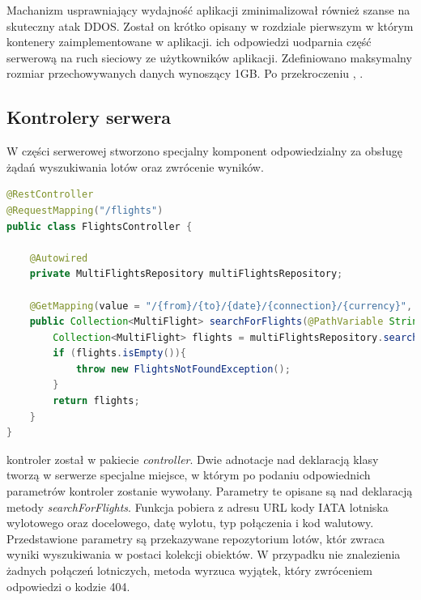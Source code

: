 \documentclass[12pt, twoside]{report}
\begin{document}
Machanizm  usprawniający wydajność aplikacji zminimalizował również szanse na skuteczny atak DDOS. Został on krótko opisany w rozdziale pierwszym w którym  kontenery  zaimplementowane w aplikacji.  ich odpowiedzi uodparnia część serwerową na  ruch sieciowy ze  użytkowników aplikacji. Zdefiniowano  maksymalny rozmiar przechowywanych danych wynoszący 1GB. Po  przekroczeniu , .

\subsection{Kontrolery serwera}
W części serwerowej stworzono specjalny komponent odpowiedzialny za obsługę żądań wyszukiwania lotów oraz zwrócenie  wyników. 
\begin{lstlisting}[language=java, caption=Kontroler zwracający wyniki wyszukiwania lotów]
@RestController
@RequestMapping("/flights")
public class FlightsController {

    @Autowired
    private MultiFlightsRepository multiFlightsRepository;

    @GetMapping(value = "/{from}/{to}/{date}/{connection}/{currency}", produces = MediaType.APPLICATION_JSON_VALUE)
    public Collection<MultiFlight> searchForFlights(@PathVariable String from, @PathVariable String to, @PathVariable String date, @PathVariable String connection, @PathVariable String currency) throws AirportsNotFoundException, IOException {
        Collection<MultiFlight> flights = multiFlightsRepository.searchForMultiFlights(from, to, date, connection, currency);
        if (flights.isEmpty()){
            throw new FlightsNotFoundException();
        }
        return flights;
    }
}
\end{lstlisting}
 kontroler został  w pakiecie \textit{controller}. Dwie adnotacje nad deklaracją klasy  tworzą w serwerze specjalne miejsce, w którym po podaniu odpowiednich parametrów kontroler zostanie wywołany. Parametry te opisane są nad deklaracją metody \textit{searchForFlights}. Funkcja pobiera z adresu URL kody IATA lotniska wylotowego oraz docelowego, datę wylotu, typ połączenia i kod walutowy. Przedstawione parametry są przekazywane   repozytorium lotów, któr zwraca wyniki wyszukiwania w postaci kolekcji obiektów. W przypadku nie znalezienia żadnych połączeń lotniczych, metoda  wyrzuca wyjątek, który  zwróceniem odpowiedzi o kodzie 404. 
\end{document}
